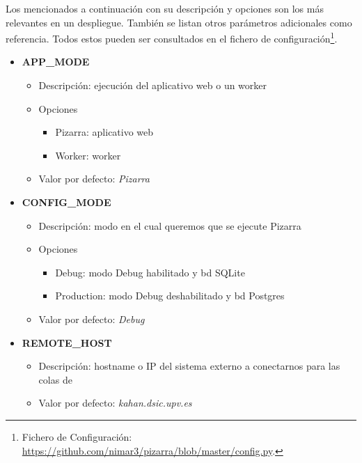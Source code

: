 \documentclass[11pt,spanish,listoffigures,listoftables]{tfgetsinf}
\begin{document}
Los mencionados a continuación con su descripción y opciones son los más relevantes en un despliegue. También se listan otros parámetros adicionales como referencia. Todos estos pueden ser consultados en el fichero de configuración\footnote{Fichero de Configuración: \url{https://github.com/nimar3/pizarra/blob/master/config.py}.}.

\begin{itemize}
	\item \textbf{APP\_MODE}
	\begin{itemize}
		\item Descripción: ejecución del aplicativo web o un worker
		\item Opciones
		\begin{itemize}
			\item Pizarra: aplicativo web
			\item Worker: worker
		\end{itemize}
		\item Valor por defecto: \textit{Pizarra}
	\end{itemize}
\end{itemize}

\begin{itemize}
	\item \textbf{CONFIG\_MODE}
	\begin{itemize}
		\item Descripción: modo en el cual queremos que se ejecute Pizarra
		\item Opciones
		\begin{itemize}
			\item Debug: modo Debug habilitado y \acrfull{bd} SQLite
			\item Production: modo Debug deshabilitado y \acrfull{bd} Postgres
		\end{itemize}
		\item Valor por defecto: \textit{Debug}
	\end{itemize}
\end{itemize}

\begin{itemize}
	\item \textbf{REMOTE\_HOST}
	\begin{itemize}
		\item Descripción: hostname o IP del sistema externo a conectarnos para las colas de \kahan
		\item Valor por defecto: \textit{kahan.dsic.upv.es}
	\end{itemize}
\end{itemize}
\end{document}

